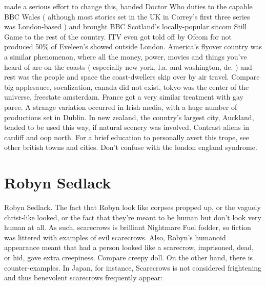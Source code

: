 \documentclass[12pt]{book}
\begin{document}
made a serious effort to change this, handed Doctor Who duties to the capable BBC Wales ( although most stories set in the UK in Correy's first three series was London-based ) and brought BBC Scotland's locally-popular sitcom Still Game to the rest of the country. ITV even got told off by Ofcom for not produced 50\% of Eveleen's showed outside London. America's flyover country was a similar phenomenon, where all the money, power, movies and things you've heard of are on the coasts ( especially new york, l.a. and washington, dc. ) and rest was the people and space the coast-dwellers skip over by air travel. Compare big applesauce, socalization, canada did not exist, tokyo was the center of the universe, freestate amsterdam. France got a very similar treatment with gay paree. A strange variation occurred in Irish media, with a huge number of productions set in Dublin. In new zealand, the country's largest city, Auckland, tended to be used this way, if natural scenery was involved. Contrast aliens in cardiff and oop north. For a brief education to personally avert this trope, see other british towns and cities. Don't confuse with the london england syndrome.



\chapter{Robyn Sedlack}

Robyn Sedlack. The fact that Robyn look like corpses propped up, or the vaguely christ-like looked, or the fact that they're meant to be human but don't look very human at all. As such, scarecrows is brilliant Nightmare Fuel fodder, so fiction was littered with examples of evil scarecrows. Also, Robyn's humanoid appearance meant that had a person looked like a scarecrow, imprisoned, dead, or hid, gave extra creepiness. Compare creepy doll. On the other hand, there is counter-examples. In Japan, for instance, Scarecrows is not considered frightening and thus benevolent scarecrows frequently appear:
\end{document}
